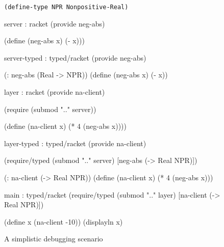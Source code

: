 \begin{figure}[h]\footnotesize

\centerline{\tt (define-type NPR Nonpositive-Real)}

\vspace\spacr

\begin{module}{server : racket}{\dyncolor}
(provide neg-abs)

(define (neg-abs x) (- x)))
\end{module}\hfill\begin{module}{server-typed : typed/racket}{\typecolor}
(provide neg-abs)

(: neg-abs (Real -> NPR))
(define (neg-abs x) (- x))
\end{module}

\vspace\spacr

\begin{module}{layer : racket}{\dyncolor}
(provide na-client)

(require (submod ".." server))

(define (na-client x)
  (* 4 (neg-abs x))))
\end{module}\hfill\begin{module}{layer-typed : typed/racket}{\typecolor}
(provide na-client)

(require/typed
 (submod ".." server)
 [neg-abs (-> Real NPR)])

(: na-client (-> Real NPR))
(define (na-client x)
  (* 4 (neg-abs x)))
\end{module}

\vspace\spacr

\begin{center}\begin{module}{main : typed/racket}{\typecolor}
(require/typed
  (submod ".." layer)
  [na-client (-> Real NPR)])

(define x (na-client -10))
(displayln x)
\end{module}\end{center}

\caption{A simplistic debugging scenario} \label{fig:rational}
\end{figure}
